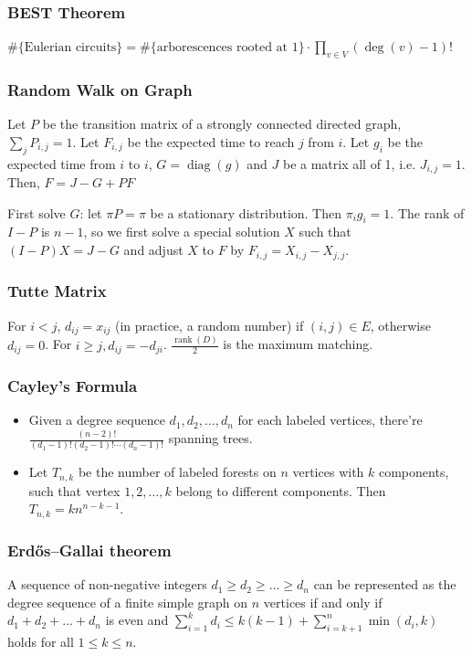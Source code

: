 \subsubsection{BEST Theorem}
$
\text{\#\{Eulerian circuits\}} =
  \text{\#\{arborescences rooted at 1\}} \cdot
   \prod _ {v \in V} (\deg(v) - 1)!
$

\subsubsection{Random Walk on Graph}
Let $P$ be the transition matrix of a strongly connected directed graph, $\sum _ j P_{i,j} = 1$.
Let $F_{i,j}$ be the expected time to reach $j$ from $i$.
Let $g_i$ be the expected time from $i$ to $i$, $G = \operatorname{diag}(g)$
and $J$ be a matrix all of 1, i.e. $J_{i,j} = 1$.
Then, $F = J - G + PF$

\noindent
First solve $G$: let $\pi P = \pi$ be a stationary distribution. Then $\pi_i g_i = 1$.
The rank of $I - P$ is $n - 1$, so we first solve a special solution $X$ such that $(I - P)X = J - G$ and adjust $X$ to $F$ by
$F_{i,j} = X_{i,j} - X_{j,j}$.

\subsubsection{Tutte Matrix}
For $i < j$, $d_{ij} = x_{ij}$ (in practice, a random number) if $(i, j) \in E$, otherwise $d_{ij} = 0$.
For $i \geq j, d_{ij} = -d_{ji}$.
$\frac{\operatorname{rank}(D)}{2}$ is the maximum matching.

\subsubsection{Cayley's Formula}
\begin{itemize}
  \item Given a degree sequence $d_1, d_2, \ldots, d_n$ for each labeled vertices, there're $\frac{(n - 2)!}{(d_1 - 1)!(d_2 - 1)!\cdots(d_n - 1)!}$ spanning trees.
  \item Let $T_{n, k}$ be the number of labeled forests on $n$ vertices with $k$ components, such that vertex $1, 2, \ldots, k$ belong to different components. Then $T_{n, k} = kn^{n - k - 1}$.
\end{itemize}

\subsubsection{Erdős–Gallai theorem}
A sequence of non-negative integers $d_1 \geq d_2 \geq \ldots \geq d_n$ can be represented as the degree sequence of a finite simple graph on $n$ vertices if and only if $d_1 + d_2 + \ldots + d_n$ is even and
$\sum_{i = 1}^{k}d_i \leq k(k - 1) + \sum_{i = k + 1}^{n}\min(d_i, k)$
holds for all $1 \leq k \leq n$.

